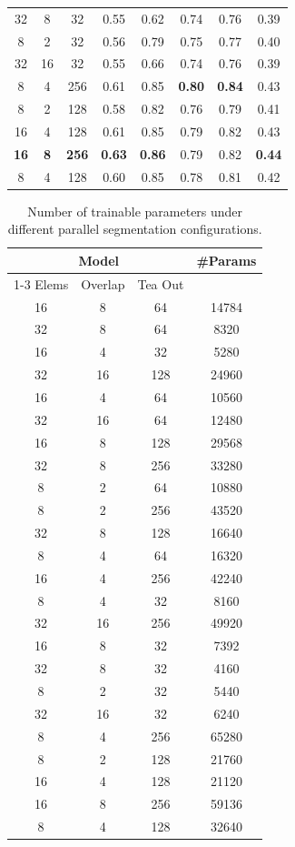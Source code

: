 \documentclass[../main.tex]{subfiles}
\begin{document}
\begin{table}[t]
{\begin{tabular}{cccccccc}
32 & 8  & 32  & 0.55 & 0.62 & 0.74 & 0.76 & 0.39 \\
8  & 2  & 32  & 0.56 & 0.79 & 0.75 & 0.77 & 0.40 \\
32 & 16 & 32  & 0.55 & 0.66 & 0.74 & 0.76 & 0.39 \\
8  & 4  & 256 & 0.61 & 0.85 & \textbf{0.80} & \textbf{0.84} & 0.43 \\
8  & 2  & 128 & 0.58 & 0.82 & 0.76 & 0.79 & 0.41 \\
16 & 4  & 128 & 0.61 & 0.85 & 0.79 & 0.82 & 0.43 \\
\textbf{16} & \textbf{8}  & \textbf{256} & \textbf{0.63} & \textbf{0.86} & 0.79 & 0.82 & \textbf{0.44} \\
8  & 4  & 128 & 0.60 & 0.85 & 0.78 & 0.81 & 0.42 \\
\bottomrule  
\end{tabular}
}
\label{tab:ranc-results}
\end{table}

\begin{table}[t]
\centering
\caption{Number of trainable parameters under different parallel segmentation configurations.}
\begin{tabular}{cccc}
\toprule
\multicolumn{3}{c}{\textbf{Model}} & \textbf{\#Params} \\
\cmidrule(lr){1-3}
Elems & Overlap & Tea Out &\\
\midrule
16 & 8 & 64 &14784 \\
32 & 8 & 64 &8320 \\
16 & 4 & 32 &5280 \\
32 & 16 & 128 &24960 \\
16 & 4 & 64 &10560 \\
32 & 16 & 64 &12480 \\
16 & 8 & 128 &29568 \\
32 & 8 & 256 &33280 \\
8 & 2 & 64 &10880 \\
8 & 2 & 256 &43520 \\
32 & 8 & 128 &16640 \\
8 & 4 & 64  &16320 \\
16 & 4 & 256 &42240 \\
8 & 4 & 32  &8160  \\
32 & 16 & 256 &49920 \\
16 & 8  & 32  &7392  \\
32 & 8  & 32  &4160  \\
8  & 2  & 32  &5440  \\
32 & 16 & 32  &6240  \\
8  & 4  & 256 &65280 \\
8  & 2  & 128 &21760 \\
16 & 4  & 128 &21120 \\
16 & 8  & 256 &59136 \\
8  & 4  & 128 &32640 \\
\bottomrule
\end{tabular}
\label{tab:num-params}
\end{table}
\end{document}
